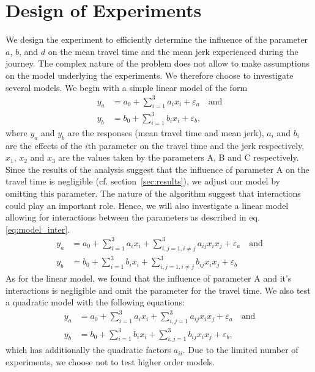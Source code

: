 
\section{Design of Experiments}

We design the experiment to efficiently determine the influence of the  parameter $a$, $b$, and $d$ on the mean travel time and the mean jerk experienced during the journey.
The complex nature of the problem does not allow to make assumptions on the model underlying the experiments. We therefore choose to investigate several models. We begin with a simple linear model of the form
\begin{subequations}
\begin{align}
	y_a &= a_0 + \displaystyle\sum_{i=1}^{3} a_i x_i + \varepsilon_a \quad \text{and}\\ 
	y_b &= b_0 + \displaystyle\sum_{i=1}^{3} b_i x_i + \varepsilon_b,
\end{align}
\end{subequations}
where $y_a$ and $y_b$ are the responses (mean travel time and mean jerk), $a_i$ and $b_i$ are the effects of the $i$th parameter on the travel time and the jerk respectively, $x_1$, $x_2$ and $x_3$ are the values taken by the parameters A, B and C respectively. Since the results of the analysis suggest that the influence of parameter A on the travel time is negligible (cf. section~\ref{sec:results}), we adjust our model by omitting this parameter.
The nature of the algorithm suggest that interactions could play an important role. Hence, we will also investigate a linear model allowing for interactions between the parameters as described in eq. \ref{eq:model_inter}.
\begin{subequations}\label{eq:model_inter}
\begin{align}
	y_a &= a_0 + \displaystyle\sum_{i=1}^{3} a_i x_i + \displaystyle\sum_{i,j=1, i \neq j}^{3} a_{ij} x_i x_j + \varepsilon_a \quad \text{and}\\ 
	y_b &= b_0 + \displaystyle\sum_{i=1}^{3} b_i x_i + \displaystyle\sum_{i,j=1, i \neq j}^{3} b_{ij} x_i x_j + \varepsilon_b
\end{align}
\end{subequations}
As for the linear model, we found that the influence of parameter A and it's interactions is negligible and omit the parameter for the travel time. We also test a quadratic model with the following equations:
\begin{subequations}\label{eq:model_inter}
\begin{align}
	y_a &= a_0 + \displaystyle\sum_{i=1}^{3} a_i x_i + \displaystyle\sum_{i,j=1}^{3} a_{ij} x_i x_j + \varepsilon_a \quad \text{and}\\ 
	y_b &= b_0 + \displaystyle\sum_{i=1}^{3} b_i x_i + \displaystyle\sum_{i,j=1}^{3} b_{ij} x_i x_j + \varepsilon_b,
\end{align}
\end{subequations}
which has additionally the quadratic factors $a_{ii}$.
Due to the limited number of experiments, we choose not to test higher order models.

